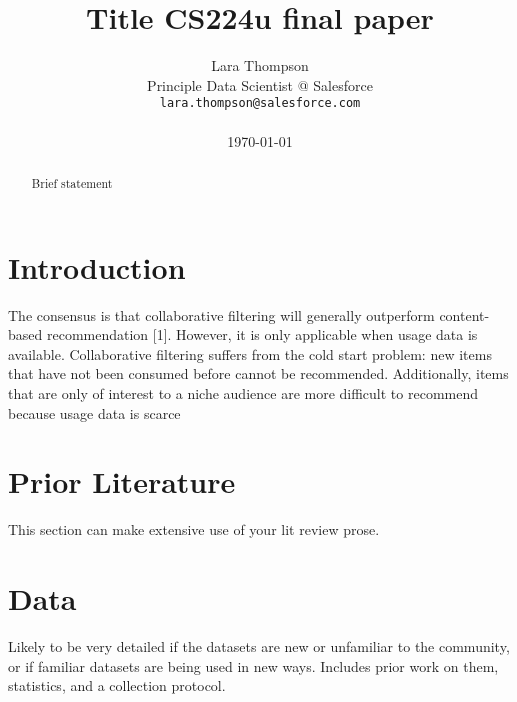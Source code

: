 \documentclass[10pt]{article}
\title{Title CS224u final paper}
\author{Lara Thompson \\
  Principle Data Scientist @ Salesforce \\
  \texttt{lara.thompson@salesforce.com} \\ \\
  \today
}
\begin{document}
\maketitle
\begin{abstract}
Brief statement %
\end{abstract}

\section{Introduction}





The consensus is that collaborative filtering will generally outperform content-based recommendation [1]. However, it is only applicable when usage data is available. Collaborative filtering suffers from the cold start problem: new items that have not been consumed before cannot be recommended. Additionally, items that are only of interest to a niche audience are more difficult to recommend because usage data is scarce

\section{Prior Literature}

This section can make extensive use of your lit review prose. \cite{Arora2017}

\section{Data}

Likely to be very detailed if the datasets are new or unfamiliar to the community, or if familiar datasets are being used in new ways.
Includes prior work on them, statistics, and a collection protocol. 
\end{document}
